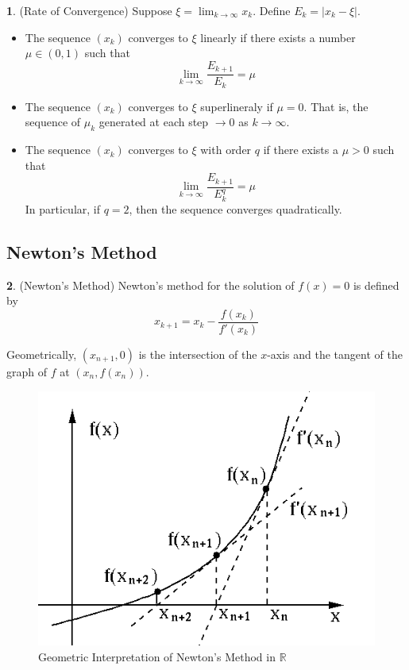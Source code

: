 \documentclass[12pt]{article}
\theoremstyle{definition}
\newtheorem{definition}{\color{NavyBlue}{\textbf{Definition}}}
\newcommand{\R}{\mathbb{R}}
\theoremstyle{definition}
\begin{document}
\begin{definition}(Rate of Convergence)
Suppose $\xi = \lim_{k \to \infty} x_k$. Define $E_k = |x_k - \xi|$.
\end{definition}
\begin{itemize}
\item The sequence $(x_k)$ converges to $\xi$ linearly if there exists a number $\mu \in (0,1)$ such that 
\begin{equation}
\lim_{k \to \infty} \frac{E_{k+1}}{E_k} = \mu
\end{equation}
\item The sequence $(x_k)$ converges to $\xi$ superlineraly if $\mu = 0$. That is, the sequence of $\mu_k$ generated at each step $\rightarrow 0$ as $k \rightarrow \infty$.
\item The sequence $(x_k)$ converges to $\xi$ with order $q$ if there exists a $\mu > 0$ such that
\begin{equation}
\lim_{k \to \infty} \frac{E_{k+1}}{E_k^q} = \mu
\end{equation}
In particular, if $q=2$, then the sequence converges quadratically.
\end{itemize}

\subsection{Newton's Method}

\begin{definition}(Newton's Method)
Newton's method for the solution of $f(x) = 0$ is defined by 
\begin{equation}
	x_{k+1} = x_k - \frac{f(x_k)}{f'(x_k)}
\end{equation}
\end{definition}

Geometrically, $(x_{n+1}, 0)$ is the intersection of the $x$-axis and the tangent of the graph of $f$ at $(x_n, f(x_n))$. 

\begin{figure}[H]
	\begin{center}
		\includegraphics[scale=.5]{newton_method.png}
	\end{center}
	\caption{Geometric Interpretation of Newton's Method in $\R$}
\end{figure}
\end{document}
